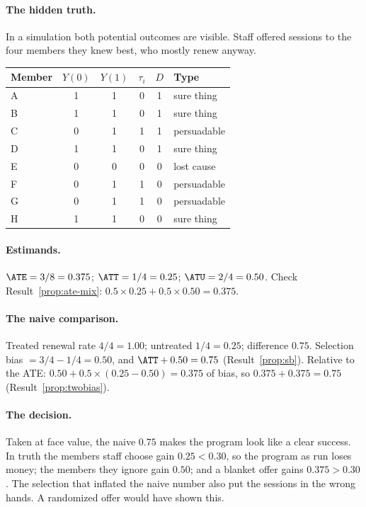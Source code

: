 \documentclass[11pt]{article}
\begin{document}
\paragraph{The hidden truth.} In a simulation both potential outcomes are visible. Staff offered sessions
to the four members they knew best, who mostly renew anyway.
\begin{center}
\begin{tabular}{lccccl}
\toprule
Member & $Y(0)$ & $Y(1)$ & $\tau_i$ & $D$ & Type \\
\midrule
A & 1 & 1 & 0 & 1 & sure thing \\
B & 1 & 1 & 0 & 1 & sure thing \\
C & 0 & 1 & 1 & 1 & persuadable \\
D & 1 & 1 & 0 & 1 & sure thing \\
E & 0 & 0 & 0 & 0 & lost cause \\
F & 0 & 1 & 1 & 0 & persuadable \\
G & 0 & 1 & 1 & 0 & persuadable \\
H & 1 & 1 & 0 & 0 & sure thing \\
\bottomrule
\end{tabular}
\end{center}

\paragraph{Estimands.} $\ATE = 3/8 = 0.375$; $\ATT = 1/4 = 0.25$; $\ATU = 2/4 = 0.50$. Check
Result~\ref{prop:ate-mix}: $0.5 \times 0.25 + 0.5 \times 0.50 = 0.375$.

\paragraph{The naive comparison.} Treated renewal rate $4/4 = 1.00$; untreated $1/4 = 0.25$; difference
$0.75$. Selection bias $= 3/4 - 1/4 = 0.50$, and $\ATT + 0.50 = 0.75$ (Result~\ref{prop:sb}). Relative to
the ATE: $0.50 + 0.5 \times (0.25 - 0.50) = 0.375$ of bias, so $0.375 + 0.375 = 0.75$
(Result~\ref{prop:twobias}).

\paragraph{The decision.} Taken at face value, the naive $0.75$ makes the program look like a clear success.
In truth the members staff choose gain $0.25 < 0.30$, so the program as run loses money; the members they
ignore gain $0.50$; and a blanket offer gains $0.375 > 0.30$. The selection that inflated the naive number also put the sessions in
the wrong hands. A randomized offer would have shown this.
\end{document}
